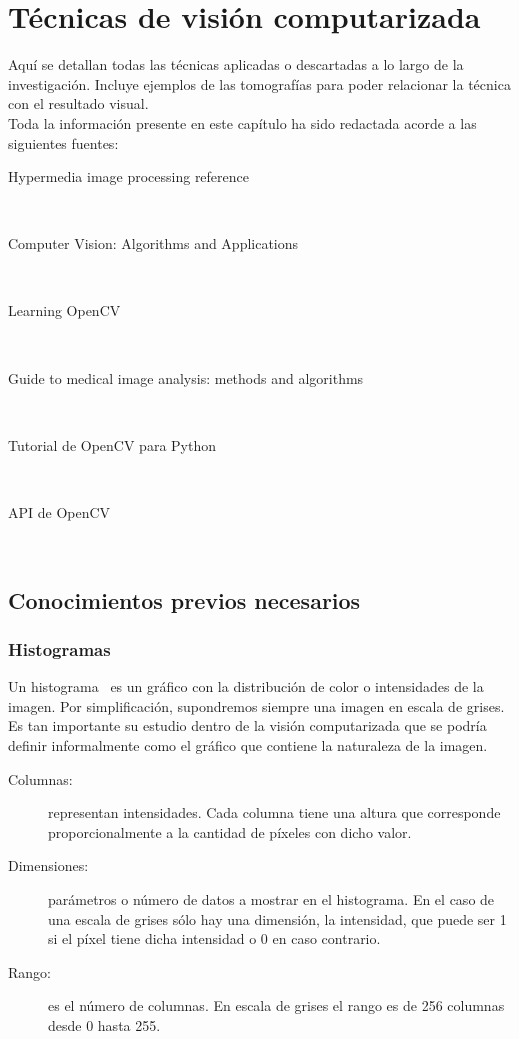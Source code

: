 \chapter{Técnicas de visión computarizada}
Aquí se detallan todas las técnicas aplicadas o descartadas a lo largo
de la investigación. Incluye ejemplos de las tomografías para poder
relacionar la técnica con el resultado visual.\\
Toda la información presente en este capítulo ha sido redactada acorde
a las siguientes fuentes:
\begin{description}
\item[Hypermedia image processing
  reference]~\emph{\citep*{fisher1996hypermedia}}
\item[Computer Vision: Algorithms and
  Applications]~\emph{\citep*{szeliski2010computer}}
\item[Learning OpenCV]~\emph{\citep*{opencv_book-bib}}
\item[Guide to medical image analysis: methods and
  algorithms]~\emph{\citep*{toennies2012guide}}
\item[Tutorial de OpenCV para
  Python]~\emph{\citep*{opencv_tutorial-bib}}
\item[API de OpenCV]~\emph{\citep*{opencv_api-bib}}
\end{description}

\section{Conocimientos previos necesarios}

\subsection{Histogramas}\label{tecnica:histogramas}
Un histograma~\emph{\citep*[Chapter 7. Histograms and
  Matching]{opencv_book-bib}} es un gráfico con la distribución de
color o intensidades de la imagen. Por simplificación, supondremos
siempre una imagen en escala de grises. Es tan importante su estudio
dentro de la visión computarizada que se podría definir informalmente
como el gráfico que contiene la naturaleza de la imagen.
\begin{description}
\item[Columnas:] representan intensidades. Cada columna tiene una
  altura que corresponde proporcionalmente a la cantidad de píxeles
  con dicho valor.
\item[Dimensiones:] parámetros o número de datos a mostrar en el
  histograma. En el caso de una escala de grises sólo hay una
  dimensión, la intensidad, que puede ser 1 si el píxel tiene dicha
  intensidad o 0 en caso contrario.
\item[Rango:] es el número de columnas. En escala de grises el rango
  es de 256 columnas desde 0 hasta 255.
\end{description}

